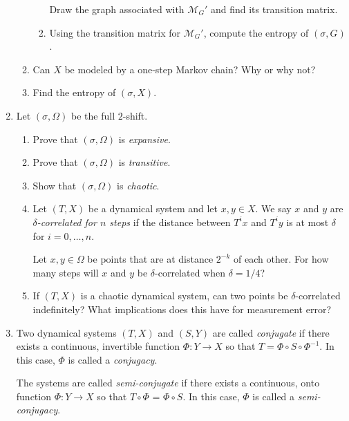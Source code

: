 \documentclass[letter]{article}
\begin{document}
\begin{enumerate}
\begin{enumerate}
\begin{enumerate}
					Draw the graph associated with $\mathcal M_G'$ and find its transition matrix.
				\item Using the transition matrix for $\mathcal M_G'$, compute the entropy of $(\sigma, G)$.
			\end{enumerate}
		\item Can $X$ be modeled by a one-step Markov chain? Why or why not?
		\item Find the entropy of $(\sigma, X)$.
			\end{enumerate}

		\item Let $(\sigma, \Omega)$ be the full $2$-shift.
		\begin{enumerate}
			\item Prove that $(\sigma, \Omega)$ is \emph{expansive}.
			\item Prove that $(\sigma, \Omega)$ is \emph{transitive}.
			\item Show that $(\sigma, \Omega)$ is \emph{chaotic}.
			\item Let $(T,X)$ be a dynamical system and let $x,y\in X$. We say $x$ and $y$ are
				\emph{$\delta$-correlated for $n$ steps} if the distance between $T^ix$ and $T^iy$ is
				at most $\delta$ for $i=0,\ldots, n$.

				Let $x,y\in \Omega$ be points that are at distance $2^{-k}$ of each other. For how many steps will
				$x$ and $y$ be $\delta$-correlated when $\delta=1/4$?
			\item If $(T,X)$ is a chaotic dynamical system, can two points be $\delta$-correlated indefinitely? What implications
				does this have for measurement error?
		\end{enumerate}


	\item Two dynamical systems $(T, X)$ and $(S,Y)$ are called \emph{conjugate} if there exists a continuous, invertible
		function $\Phi\colon Y\to X$ so that $T=\Phi\circ S\circ \Phi^{-1}$. In this case, $\Phi$ is called a \emph{conjugacy}.

		The systems are called \emph{semi-conjugate} if there
			exists a continuous, onto function $\Phi\colon Y\to X$ so that
			$T\circ\Phi$ = $\Phi\circ S$. In this case, $\Phi$ is called a \emph{semi-conjugacy}.



\end{enumerate}
\end{document}
